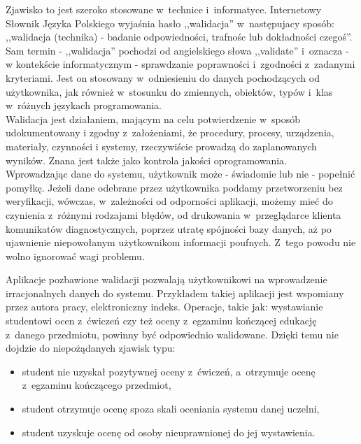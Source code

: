 \documentclass[brudnopis]{xmgr}
\begin{document}
\indent \textcolor{wa}{Zjawisko to jest szeroko stosowane w~technice i~informatyce. Internetowy Słownik
Języka Polskiego wyjaśnia hasło ,,walidacja'' w~następujacy sposób: ,,walidacja
(technika) - badanie odpowiedności, trafnośc lub dokładności czegoś''.\cite{ValidationSJP}}
\\
\indent \textcolor{wa}{Sam termin - ,,walidacja'' pochodzi od angielskiego słowa ,,validate'' i~oznacza -
w kontekście informatycznym - sprawdzanie poprawności i~zgodności z~zadanymi
kryteriami. Jest on stosowany w~odniesieniu do danych pochodzących od użytkownika,
jak również w~stosunku do zmiennych, obiektów, typów i~klas w~różnych językach
programowania.\cite{ValidationTermin}}
\\
\indent \textcolor{wa}{Walidacja jest działaniem, mającym na celu potwierdzenie w~sposób udokumentowany
i zgodny z~założeniami, że procedury, procesy, urządzenia, materiały, czynności
i systemy, rzeczywiście prowadzą do zaplanowanych wyników. Znana jest także jako
kontrola jakości oprogramowania.\cite{Validation2}}
\\
\indent \textcolor{wa}{Wprowadzając dane do systemu, użytkownik może - świadomie lub nie - popełnić
pomyłkę. Jeżeli dane odebrane przez użytkownika poddamy przetworzeniu bez weryfikacji,
wówczas, w~zależności od odporności aplikacji, możemy mieć do czynienia z~różnymi
rodzajami błędów, od drukowania w~przeglądarce klienta komunikatów diagnostycznych,
poprzez utratę spójności bazy danych, aż po ujawnienie niepowołanym użytkownikom
informacji poufnych. Z~tego powodu nie wolno ignorować wagi problemu.}
\\
\indent \textcolor{wc}{Aplikacje pozbawione walidacji pozwalają użytkownikowi na wprowadzenie irracjonalnych
danych do systemu. Przykładem takiej aplikacji jest wspomiany przez autora pracy,
elektroniczny indeks. Operacje, takie jak: wystawianie studentowi ocen z~ćwiczeń
czy też oceny z~egzaminu kończącej edukację z~danego przedmiotu, powinny być
odpowiednio walidowane. Dzięki temu nie dojdzie do niepożądanych zjawisk typu:
\begin{itemize}
\item student nie uzyskał pozytywnej oceny z~ćwiczeń, a~otrzymuje ocenę z~egzaminu
kończącego przedmiot,
\item student otrzymuje ocenę spoza skali oceniania systemu danej uczelni,
\item student uzyskuje ocenę od osoby nieuprawnionej do jej wystawienia.
\end{itemize}}
\end{document}
